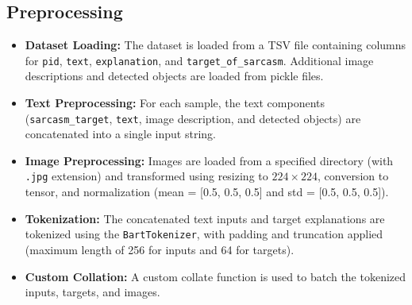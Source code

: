 \documentclass{article}
\begin{document}
\subsection{Preprocessing}
\begin{itemize}
    \item \textbf{Dataset Loading:} The dataset is loaded from a TSV file containing columns for \texttt{pid}, \texttt{text}, \texttt{explanation}, and \texttt{target\_of\_sarcasm}. Additional image descriptions and detected objects are loaded from pickle files.
    \item \textbf{Text Preprocessing:} For each sample, the text components (\texttt{sarcasm\_target}, \texttt{text}, image description, and detected objects) are concatenated into a single input string.
    \item \textbf{Image Preprocessing:} Images are loaded from a specified directory (with \texttt{.jpg} extension) and transformed using resizing to \(224 \times 224\), conversion to tensor, and normalization (mean = [0.5, 0.5, 0.5] and std = [0.5, 0.5, 0.5]).
    \item \textbf{Tokenization:} The concatenated text inputs and target explanations are tokenized using the \texttt{BartTokenizer}, with padding and truncation applied (maximum length of 256 for inputs and 64 for targets).
    \item \textbf{Custom Collation:} A custom collate function is used to batch the tokenized inputs, targets, and images.
\end{itemize}
\end{document}
